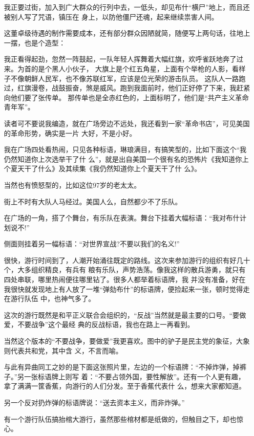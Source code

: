 ﻿\documentclass[11pt]{article}
\begin{document}
我正要过街，加入到广大群众的行列中去，一低头，却见布什``横尸''地上，而且还被别人写了咒语，镇压在
身上，以防他僵尸还魂，起来继续祟害人间。

这董卓级待遇的制作需要成本，还有部分群众因陋就简，随便写上两句话，往地上一摆，也是个造型：

我正看得起劲，忽然一阵鼓起，一队年轻人挥舞着大幅红旗，欢呼雀跃地奔了过来。为首的是个黑人小伙子，
大旗上是个红五角星，上面有个举枪的人影，看样子不像朝鲜人民军，也不像苏联红军，应该是位光荣的游击队员。
这队人一路跑过，红旗漫卷，战鼓振奋，煞是威风。跑到我面前时，他们正好停了下来，我赶紧向他们要了张传单。
那传单也是全赤红色的，上面标明了，他们是``共产主义革命青年军''。

读者可不要说我编造，就在广场旁边不远处，我还看到一家``革命书店''，可见美国的革命形势，确实是一片
大好，不是小好。

我在广场四处看热闹，只见各种标语，琳琅满目，有搞笑型的，比如下面这个``我仍然知道你上次选举干了什
么''，就是出自美国一个很有名的恐怖片《我知道你上个夏天干了什么》及其续集《我仍然知道你上个夏天干了什
么》。

当然也有愤怒型的，比如这位97岁的老太太。

街上不时有大队人马经过。美国人么，自然都少不了乐队。

在广场的一角，搭了个舞台，有乐队在表演。舞台下挂着大幅标语：``我对布什计划说不!''

侧面则挂着另一幅标语：``对世界宣战?不要以我们的名义!''

很快，游行时间到了，人潮开始涌往既定的路线。这次来参加游行的组织有好几十个，大多组织精良，有兵有
粮有乐队，声势浩荡。像我这样的散兵游勇，就只有四处串联，哪里热闹便往哪里钻了。很多人都举着标语牌，我
并没有准备，好在我很快就发现地上有人放了一堆``弹劾布什''的标语牌，便捡起来一张，顿时觉得走在游行队伍
中，也神气多了。

这次的游行既然是和平正义联合会组织的，``反战''当然就是最主要的口号。``要做爱，不要战争''这个最经
典的反战标语，我也在路上一再看到。

当然这个版本的``不要战争，要做爱''我更喜欢。图中的驴子是民主党的象征，大象则代表共和党，其中含
义，不言而喻。

与此有异曲同工之妙的是下面这张照片里，左边的一个标语牌：``不掉炸弹，掉裤子。''另一张标语牌上则写
着：``不要占领外国，要性解放''。还有一个人更有趣，拿了满满一筐香蕉，向游行的人们分发。至于香蕉代表什
么，想来大家都知道。

另一个反对扔炸弹的标语牌说：``送去资本主义，而非炸弹。''

有一个游行队伍搞抬棺大游行，虽然那些棺材都是纸做的，但触目之下，却也惊心。
\end{document}

